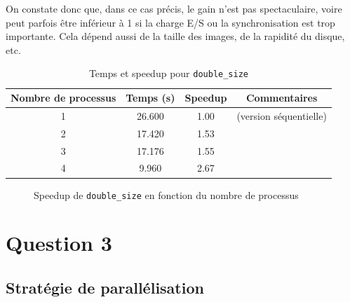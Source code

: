 \documentclass[a4paper,13pt]{book}
\begin{document}
On constate donc que, dans ce cas précis, le gain n’est pas spectaculaire, voire peut parfois être inférieur à 1 si la charge E/S ou la synchronisation est trop importante. Cela dépend aussi de la taille des images, de la rapidité du disque, etc.
\begin{table}[h!]
    \centering
    \caption{Temps et speedup pour \texttt{double\_size}}
    \label{tab:double\_size}
    \begin{tabular}{@{}cccc@{}}
    \toprule
    \textbf{Nombre de processus} & \textbf{Temps (s)} & \textbf{Speedup} & \textbf{Commentaires}\\
    \midrule
    1 & 26.600 & 1.00 & (version séquentielle)\\
    2 & 17.420 & 1.53 & \\
    3 & 17.176 & 1.55 & \\
    4 & 9.960  & 2.67 & \\
    \bottomrule
    \end{tabular}
    \end{table}
    \begin{figure}[h!]
        \centering
        \caption{Speedup de \texttt{double\_size} en fonction du nombre de processus}
        \label{fig:double\_size_speedup}
        \end{figure}

\section{Question 3}
\subsection{Stratégie de parallélisation}
\end{document}

